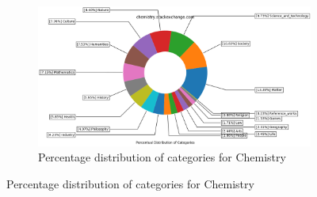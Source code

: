 \begin{figure}[H]
	\begin{subfigure}{0.9\textwidth}
    \centering
    	\includegraphics[width=1\linewidth]{imgs/percentual-distribution/chemistry_stackexchange_com_donut}
        \caption{Percentage distribution of categories for Chemistry}
        \label{fig:percentage-distribution-chemistry}
    \end{subfigure}%
\end{figure}
    

